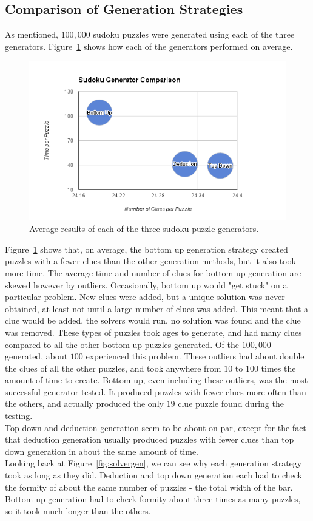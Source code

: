 \subsection{Comparison of Generation Strategies}
As mentioned, $100,000$ sudoku puzzles were generated using each of the three generators. Figure~\ref{fig:generators} shows how each of
the generators performed on average.
\begin{figure}[H]
    \centering
    \includegraphics[scale=0.70]{generators.png}
    \caption{Average results of each of the three sudoku puzzle generators.}
    \label{fig:generators}
\end{figure}
Figure~\ref{fig:generators} shows that, on average, the bottom up generation strategy created puzzles with a fewer clues than the other
generation methods, but it also took more time. The average time and number of clues for bottom up generation are skewed however by outliers.
Occasionally, bottom up would "get stuck" on a particular problem. New clues were added, but a unique solution was never obtained,
at least not until a large number of clues was added. This meant that a clue would be added, the solvers would run, no solution was found and the
clue was removed. These types of puzzles took ages to generate, and had many clues compared to all the other bottom up puzzles generated.
Of the $100,000$ generated, about $100$ experienced this problem. These outliers had about double the clues of all the other puzzles, and took
anywhere from $10$ to $100$ times the amount of time to create. Bottom up, even including these outliers, was the most successful generator tested.
It produced puzzles with fewer clues more often than the others, and actually produced the only $19$ clue puzzle found during the testing.\\
Top down and deduction generation seem to be about on par, except for the fact that deduction generation usually produced puzzles with fewer
clues than top down generation in about the same amount of time.\\
Looking back at Figure~\ref{fig:solvergen}, we can see why each generation strategy took as long as they did. Deduction and top down generation
each had to check the formity of about the same number of puzzles - the total width of the bar. Bottom up generation had to check formity about
three times as many puzzles, so it took much longer than the others.


